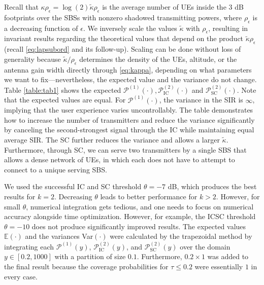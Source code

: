 \documentclass[lettersize,journal]{IEEEtran}
\begin{document}
Recall that $ \kappa \rho_{\epsilon}=\log(2)\tilde{\kappa} \rho_{\epsilon} $ is the average number of UEs inside the $3$ dB footprints over the SBSs with nonzero shadowed transmitting powers, where $\rho_{\epsilon}$ is a decreasing function of $\epsilon$. We inversely scale the values $\tilde{\kappa}$ with $\rho_{\epsilon}$, resulting in invariant results regarding the theoretical values that depend on the product $\tilde{\kappa} \rho_{\epsilon}$ (recall \eqref{eq:lapsubord} and its follow-up). Scaling can be done without loss of generality because $\tilde{\kappa}/\rho_{\epsilon}$ determines the density of the UEs, altitude, or the antenna gain width directly through \eqref{eq:kappa}, depending on what parameters we want to fix---nevertheless, the expected value and the variance do not change. Table \ref{table:tab1} shows the expected $\mathcal{P}^{(1)}(\cdot), \mathcal{P}^{(2)}_{\text{IC}}(\cdot) $ and $\mathcal{P}^{(2)}_{\text{SC}}(\cdot)$. Note that the expected values are equal. For $\mathcal{P}^{(1)}(\cdot)$, the variance in the SIR is $\infty$, implying that the user experience varies uncontrollably. The table demonstrates how to increase the number of transmitters and reduce the variance significantly by canceling the second-strongest signal through the IC while maintaining equal average SIR. The SC further reduces the variance and allows a larger $\tilde{\kappa}$. Furthermore, through SC, we can serve two transmitters by a single SBS that allows a dense network of UEs, in which each does not have to attempt to connect to a unique serving SBS. 




We used the successful IC and SC threshold $\theta = -7$ dB, which produces the best results for $k=2$. Decreasing $\theta$ leads to better performance for $k>2$. However, for small $\theta$, numerical integration gets tedious, and one needs to focus on numerical accuracy alongside time optimization. However, for example, the ICSC threshold  $\theta = -10$ does not produce significantly improved results. The expected values $\mathbb{E}(\cdot)$ and the variances Var$(\cdot)$  were calculated by the trapezoidal method by integrating each $\mathcal{P}^{(1)}(y)$, $\mathcal{P}^{(2)}_{\text{IC}}(y)$, and $\mathcal{P}^{(2)}_{\text{SC}}(y)$ over the domain $y \in [0.2, 1000]$ with a partition of size $0.1$. Furthermore, $0.2 \times 1$ was added to the final result because the coverage probabilities for $\tau \leq 0.2$ were essentially $1$ in every case. 







%

\end{document}
